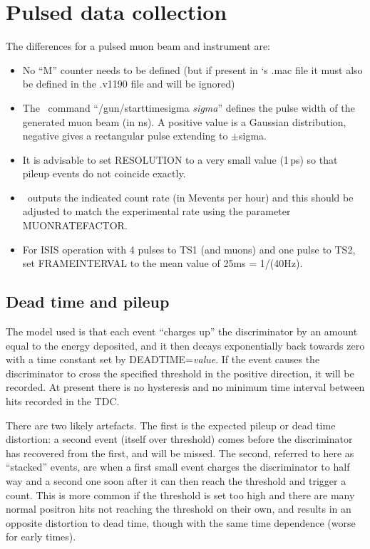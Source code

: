 \documentclass[twoside]{dis04}
\begin{document}
\section{Pulsed data collection}
\label{sect_pulsed}
The differences for a pulsed muon beam and instrument are:
\begin{itemize}
\item No ``M'' counter needs to be defined (but if present in \musrSim`s .mac file it must also be defined in the .v1190 file and will be ignored)
\item The  \musrSim \ command ``/gun/starttimesigma \emph{sigma}'' defines the pulse width of the generated muon beam (in ns). A positive value is a Gaussian distribution, negative gives a rectangular pulse extending to $\pm$sigma.
\item It is advisable to set RESOLUTION to a very small value (1\,ps) so that pileup events do not coincide exactly. 
\item \musrSimAna \  outputs the indicated count rate (in Mevents per hour) and this should be adjusted to match the experimental rate using the parameter MUONRATEFACTOR.
\item For ISIS operation with 4 pulses to TS1 (and muons) and one pulse to TS2, set FRAMEINTERVAL to the mean value of 25ms = 1/(40Hz).
\end{itemize}
\subsection{Dead time and pileup}
The model used is that each event ``charges up'' the discriminator by an amount equal to the energy deposited, and it then decays exponentially back towards zero with a time constant set by DEADTIME=\emph{value}. If the event causes the discriminator to cross the specified threshold in the positive direction, it will be recorded. At present there is no hysteresis and no minimum time interval between hits recorded in the TDC.

There are two likely artefacts. The first is the expected pileup or dead time distortion: a second event (itself over threshold) comes before the discriminator has recovered from the first, and will be missed. The second, referred to here as ``stacked'' events, are when a first small event charges the discriminator to half way and a second one soon after it can then reach the threshold and trigger a count. This is more common if the threshold is set too high and there are many normal positron hits not reaching the threshold on their own, and results in an opposite distortion to dead time, though with the same time dependence (worse for early times).
\end{document}
